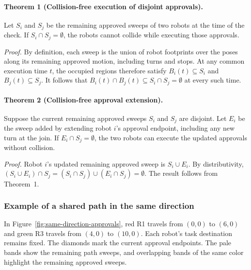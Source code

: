 \documentclass[11pt,a4paper]{article}
\begin{document}
\paragraph{Theorem 1 (Collision-free execution of disjoint approvals).}
Let $S_i$ and $S_j$ be the remaining approved sweeps of two robots at
the time of the check. If $S_i\cap S_j=\emptyset$, the robots cannot
collide while executing those approvals.

\emph{Proof.}
By definition, each sweep is the union of robot footprints over the
poses along its remaining approved motion, including turns and stops.
At any common execution time $t$, the occupied regions therefore satisfy
$B_i(t)\subseteq S_i$ and $B_j(t)\subseteq S_j$. It follows that
$B_i(t)\cap B_j(t)\subseteq S_i\cap S_j=\emptyset$ at every such time.

\paragraph{Theorem 2 (Collision-free approval extension).}
Suppose the current remaining approved sweeps $S_i$ and $S_j$ are
disjoint. Let $E_i$ be the sweep added by extending robot $i$'s approval
endpoint, including any new turn at the join. If $E_i\cap S_j=\emptyset$,
the two robots can execute the updated approvals without collision.

\emph{Proof.}
Robot $i$'s updated remaining approved sweep is $S_i\cup E_i$.
By distributivity,
$(S_i\cup E_i)\cap S_j=(S_i\cap S_j)\cup(E_i\cap S_j)=\emptyset$.
The result follows from Theorem~1.

\subsubsection{Example of a shared path in the same direction}
In Figure~\ref{fig:same-direction-approvals}, red R1 travels from $(0,0)$
to $(6,0)$ and green R3 travels from $(4,0)$ to $(10,0)$. Each robot's
task destination remains fixed. The diamonds mark the current approval
endpoints. The pale bands show the remaining path sweeps, and overlapping
bands of the same color highlight the remaining approved sweeps.
\end{document}

